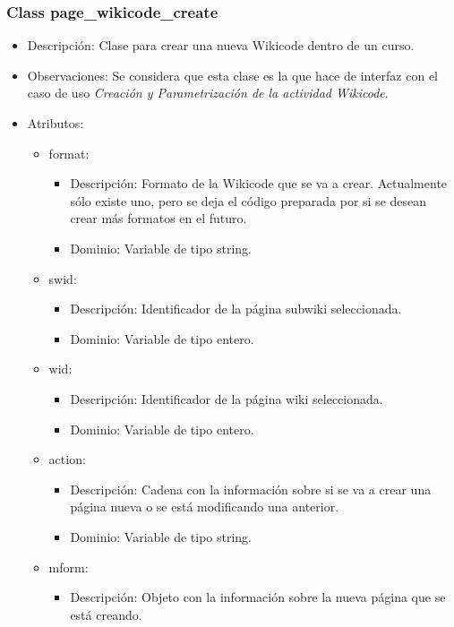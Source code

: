 \subsubsection{Class page\_wikicode\_create}

\begin{itemize}
	\item Descripción: Clase para crear una nueva Wikicode dentro de un curso.
	\item Observaciones: Se considera que esta clase es la que hace de interfaz con el caso de uso \emph{Creación y Parametrización de la actividad Wikicode}.
	\item Atributos:
		\begin{itemize}
			\item format:
				\begin{itemize}
					\item Descripción: Formato de la Wikicode que se va a crear. Actualmente sólo existe uno, pero se deja el código preparada por si se desean crear más formatos en el futuro.
					\item Dominio: Variable de tipo string.
				\end{itemize}
			\item swid:
				\begin{itemize}
					\item Descripción: Identificador de la página subwiki seleccionada.
					\item Dominio: Variable de tipo entero.
				\end{itemize}
			\item wid:
				\begin{itemize}
					\item Descripción: Identificador de la página wiki seleccionada.
					\item Dominio: Variable de tipo entero.
				\end{itemize}
			\item action:
				\begin{itemize}
					\item Descripción: Cadena con la información sobre si se va a crear una página nueva o se está modificando una anterior.
					\item Dominio: Variable de tipo string.
				\end{itemize}
			\item mform:
				\begin{itemize}
					\item Descripción: Objeto con la información sobre la nueva página que se está creando.

\end{itemize}
\end{itemize}
\end{itemize}

